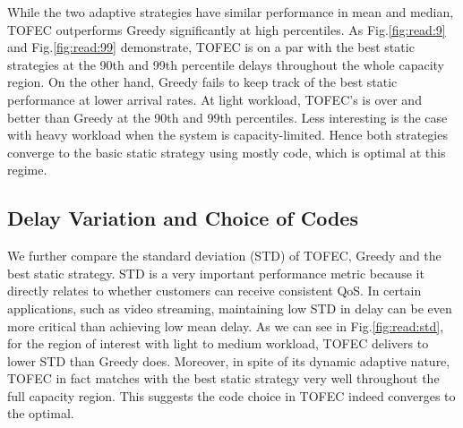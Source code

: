 \documentclass[journal]{IEEEtran}
\newcommand{\comment}[1]{}
\newcommand{\ourproposal}{TOFEC\xspace}
\begin{document}
While the two adaptive strategies have similar performance in mean and median, \ourproposal outperforms Greedy significantly at high percentiles. As Fig.\ref{fig:read:9} and Fig.\ref{fig:read:99} demonstrate, \ourproposal is on a par with the best static strategies at the 90th and 99th percentile delays throughout the whole capacity region. On the other hand, Greedy fails to keep track of the best static performance at lower arrival rates. At light workload, \ourproposal 's is over  and  better than Greedy at the 90th and 99th percentiles. Less interesting is the case with heavy workload when the system is capacity-limited. Hence both strategies converge to the basic static strategy using mostly  code, which is optimal at this regime.




\subsection{Delay Variation and Choice of Codes}

\comment{
In Fig.\ref{fig:read:codeDim} and Fig.\ref{fig:read:codeLength} we plot the average code dimension  and code length  in \ourproposal and Greedy, as well as the code used by the static strategies that produce the best mean delay at different arrival rates. These figures again confirm that the adaptation algorithms of \ourproposal and Greedy are working as they are designed to: the average code dimension and length both match with the best static strategies quite well. Greedy is a bit too aggressive in choosing code dimension when compared with the best static strategy: the average code dimension of Greedy is always at least as large as that of the best static strategy. On the contrary,  \ourproposal's choice of code dimension turns out to be a better interpolation of the best static strategy.
}

We further compare the standard deviation (STD) of \ourproposal, Greedy and the best static strategy. STD is a very important performance metric because it directly relates to whether customers can receive consistent QoS. In certain applications, such as video streaming, maintaining low STD in delay can be even more critical than achieving low mean delay. As we can see in Fig.\ref{fig:read:std}, for the region of interest with light to medium workload, \ourproposal delivers  to  lower STD than Greedy does. Moreover, in spite of its dynamic adaptive nature, \ourproposal in fact matches with the best static strategy very well throughout the full capacity region. This suggests the code choice in \ourproposal indeed converges to the optimal.
\end{document}

